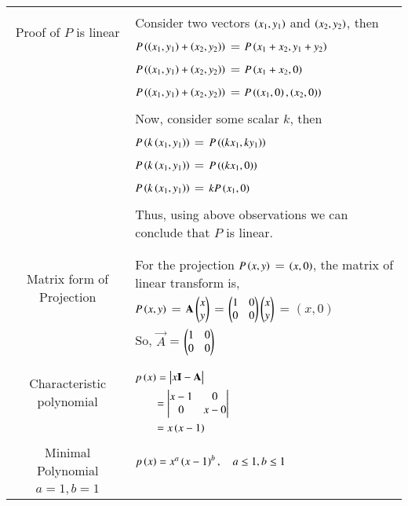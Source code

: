 \begin{longtable}{|c|l|}
    \hline
	\multirow{3}{*}{Proof of $P$ is linear} 
	& \\
	& Consider two vectors  $\left(x_1,y_1\right)$ and $\left(x_2,y_2\right)$, then\\
	& $P\left(\left(x_1,y_1\right)+\left(x_2,y_2\right)\right)$ = $P\left(x_1+x_2,y_1+y_2\right)$ \\
	& $P\left(\left(x_1,y_1\right)+\left(x_2,y_2\right)\right)$ = $P\left(x_1+x_2,0\right)$ \\
	& $P\left(\left(x_1,y_1\right)+\left(x_2,y_2\right)\right)$ = $P\left(\left(x_1,0\right),\left(x_2,0\right)\right)$\\
    & \\
    & Now, consider some scalar $k$, then\\
    & $P\left(k\left(x_1,y_1\right)\right)$ = $P\left(\left(kx_1,ky_1\right)\right)$ \\
    & $P\left(k\left(x_1,y_1\right)\right)$ = $P\left(\left(kx_1,0\right)\right)$ \\
    & $P\left(k\left(x_1,y_1\right)\right)$ = $kP\left(x_1,0\right)$ \\
    & \\
    & Thus, using above observations we can conclude that $P$ is linear.\\
	&\\
    \hline
	\multirow{3}{*}{Matrix form of Projection} 
	& \\
	& For the projection $P\left(x,y\right)$ = $\left(x,0\right)$, the matrix of linear transform is,\\
	& $P\left(x,y\right)$ = $\mathbf{A}\begin{pmatrix}x\\y\end{pmatrix}$ = $\begin{pmatrix}1&0\\0&0\end{pmatrix} \begin{pmatrix}x\\y\end{pmatrix}$  = $(x,0)$\\
	& So, $\vec{A}$ = $\begin{pmatrix}1&0\\0&0\end{pmatrix}$\\
	&\\
	\hline
	\multirow{3}{*}{Characteristic polynomial} 
	& \\
	& $p\brak{x}=\mydet{x\Vec{I}-\Vec{A}}$\\
	& $\qquad = \begin{vmatrix}x-1&0\\0&x-0\end{vmatrix}$\\
	&$\qquad=x\left(x-1\right)$\\
	&\\
	\hline
	\multirow{3}{*}{Minimal Polynomial} & \\
	& $p\left(x\right)=x^a\left(x-1\right)^b,\quad a\leq1, b\leq1$\\
	&\\
	\hline
	\multirow{3}{*}{$a=1,b=1$} & \\

\end{longtable}
